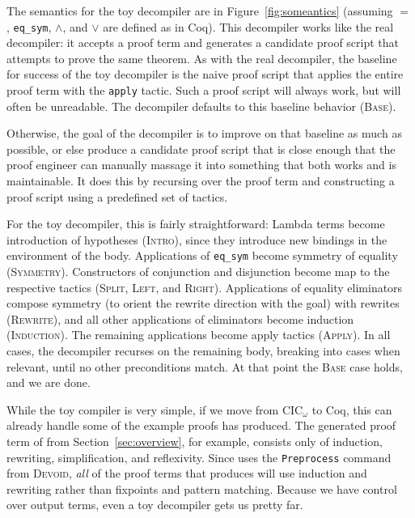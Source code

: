 The semantics for the toy decompiler are in Figure~\ref{fig:someantics} (assuming $=$, \lstinline{eq_sym}, $\wedge$, and $\vee$ are defined as in Coq).
This decompiler works like the real decompiler: it accepts a proof term and generates a candidate proof script that attempts to prove the same theorem.
As with the real decompiler, the baseline for success of the toy decompiler is the naive proof script
that applies the entire proof term with the \lstinline{apply} tactic.
Such a proof script will always work, but will often be unreadable.
The decompiler defaults to this baseline behavior (\textsc{Base}).

Otherwise, the goal of the decompiler is to improve on that baseline as much as possible,
or else produce a candidate proof script that is close enough that the proof engineer can manually massage it into something that
both works and is maintainable.
It does this by recursing over the proof term and constructing a proof script using a predefined set of tactics.

For the toy decompiler, this is fairly straightforward: Lambda terms become introduction of hypotheses (\textsc{Intro}), since they introduce new bindings
in the environment of the body. Applications of \lstinline{eq_sym} become symmetry of equality (\textsc{Symmetry}).
Constructors of conjunction and disjunction become map to the respective tactics (\textsc{Split}, \textsc{Left}, and \textsc{Right}).
Applications of equality eliminators compose symmetry (to orient the rewrite direction with the goal) with rewrites (\textsc{Rewrite}),
and all other applications of eliminators become induction (\textsc{Induction}).
The remaining applications become apply tactics (\textsc{Apply}).
In all cases, the decompiler recurses on the remaining body, breaking into cases when relevant, until no other preconditions match.
At that point the \textsc{Base} case holds, and we are done.

While the toy compiler is very simple, if we move from CIC$_{\omega}$ to Coq,
this can already handle some of the example proofs \toolname has produced.
The generated proof term of  from Section~\ref{sec:overview},
for example, consists only of induction, rewriting, simplification, and reflexivity.
Since \toolname uses the \lstinline{Preprocess} command from \textsc{Devoid}, \textit{all} of the proof terms that \toolname
produces will use induction and rewriting rather than fixpoints and pattern matching.
Because we have control over output terms, even a toy decompiler gets us pretty far.

